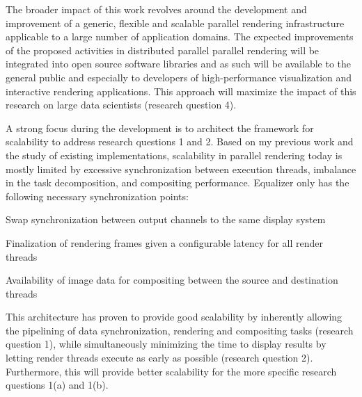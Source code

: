 The broader impact of this work revolves around the development and improvement
of a generic, flexible and scalable parallel rendering infrastructure applicable
to a large number of application domains. The expected improvements of the
proposed activities in distributed parallel parallel rendering will be
integrated into open source software libraries and as such will be available to
the general public and especially to developers of high-performance
visualization and interactive rendering applications. This approach will
maximize the impact of this research on large data scientists (research question
4).

A strong focus during the development is to architect the framework for
scalability to address research questions 1 and 2. Based on my previous work and
the study of existing implementations, scalability in parallel rendering today
is mostly limited by excessive synchronization between execution threads,
imbalance in the task decomposition, and compositing performance. Equalizer only
has the following necessary synchronization points:
%
\begin{compactenum}
\item Swap synchronization between output channels to the same display system
\item Finalization of rendering frames given a configurable latency for all render threads
\item Availability of image data for compositing between the source and destination threads
\end{compactenum}
%
This architecture has proven to provide good scalability by inherently allowing
the pipelining of data synchronization, rendering and compositing tasks
(research question 1), while simultaneously minimizing the time to display
results by letting render threads execute as early as possible (research
question 2). Furthermore, this will provide better scalability for the more
specific research questions 1(a) and 1(b).

